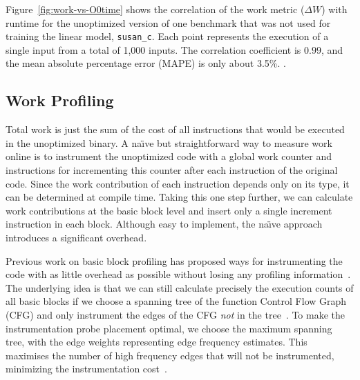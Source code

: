     Figure~\ref{fig:work-vs-O0time} shows the correlation of the work metric ($\Delta W$) with runtime for the unoptimized version of one
    benchmark that was not used for training the linear model, \texttt{susan\_c}. Each point represents the execution of a single input
    from a total of 1,000 inputs. The correlation coefficient is $0.99$, and the mean absolute percentage error (MAPE) is only about 3.5\%.
    .


    \subsection{Work Profiling}\label{subsec:prof}

    Total work is just the sum of the cost of all instructions that would be executed in the unoptimized binary. A na\"{\i}ve but
    straightforward way to measure work online is to instrument the unoptimized code with a global work counter and instructions for
    incrementing this counter after each instruction of the original code. Since the work contribution of each instruction depends only on
    its type, it can be determined at compile time. Taking this one step further, we can calculate work contributions at the basic block
    level and insert only a single increment instruction in each block. Although easy to implement, the na\"{\i}ve approach introduces a
    significant overhead.

    Previous work on basic block profiling has proposed ways for instrumenting the code with as little overhead as possible without losing
    any profiling information~\cite{knuth73,ball94}. The underlying idea is that we can still calculate precisely the execution counts of
    all basic blocks if we choose a spanning tree of the function Control Flow Graph (CFG) and only instrument the edges of the CFG
    \textit{not} in the tree~\cite{nahapetian73,forman81}. To make the instrumentation probe placement optimal, we choose the maximum
    spanning tree, with the edge weights representing edge frequency estimates. This maximises the number of high frequency edges that will
    not be instrumented, minimizing the instrumentation cost~\cite{forman81,ball94}. 
    
